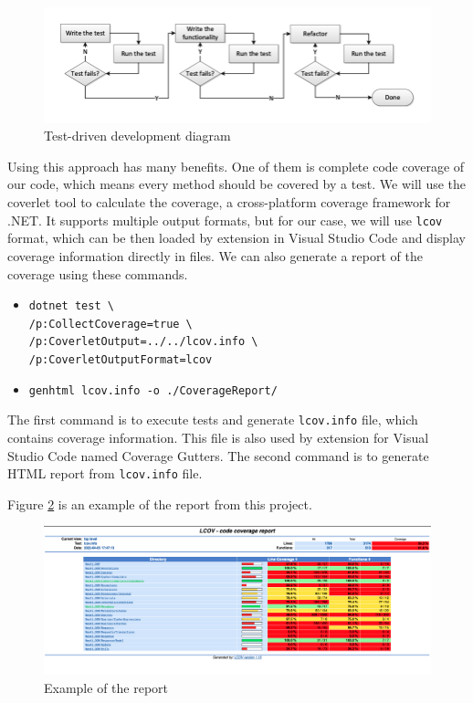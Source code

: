 \begin{figure}[H]
    \centering
    \includegraphics[width=\textwidth]{content/Test-Driven-Development-activities.png}
    \caption{Test-driven development diagram \cite{noauthor_continuous_2013}}
    \label{fig:tddDiagram}
\end{figure}

Using this approach has many benefits. One of them is complete code coverage of our code, which means every method should be covered by a test.
We will use the coverlet tool to calculate the coverage, a cross-platform coverage framework for .NET. \cite{noauthor_coverlet_2022}
It supports multiple output formats, but for our case, we will use \texttt{lcov} format, which can be then loaded by extension in Visual Studio Code and display coverage information directly in files.
We can also generate a report of the coverage using these commands.
\begin{itemize}
    \item {\texttt{dotnet test \textbackslash\\
              /p:CollectCoverage=true \textbackslash\\/p:CoverletOutput=../../lcov.info \textbackslash\\/p:CoverletOutputFormat=lcov}}
    \item {\texttt{genhtml lcov.info -o ./CoverageReport/}}
\end{itemize}
The first command is to execute tests and generate \texttt{lcov.info} file, which contains coverage information. This file is also used by extension for Visual Studio Code
named Coverage Gutters.
The second command is to generate HTML report from \texttt{lcov.info} file.

Figure \ref{fig:report} is an example of the report from this project.

\begin{figure}[H]
    \centering
    \includegraphics[width=\textwidth]{content/coverage_report.png}
    \caption{Example of the report}
    \label{fig:report}
\end{figure}

